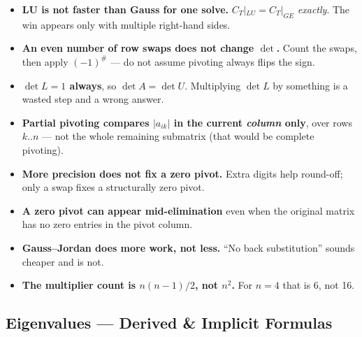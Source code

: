 \begin{trapbox}
\begin{itemize}
\item \textbf{LU is not faster than Gauss for one solve.} $C_T|_{LU} = C_T|_{GE}$ \emph{exactly}. The win appears only with multiple right-hand sides.
\item \textbf{An even number of row swaps does not change $\det$.} Count the swaps, then apply $(-1)^{\#}$ --- do not assume pivoting always flips the sign.
\item \textbf{$\det L = 1$ always}, so $\det A = \det U$. Multiplying $\det L$ by something is a wasted step and a wrong answer.
\item \textbf{Partial pivoting compares $|a_{ik}|$ in the current \emph{column} only}, over rows $k..n$ --- not the whole remaining submatrix (that would be complete pivoting).
\item \textbf{More precision does not fix a zero pivot.} Extra digits help round-off; only a swap fixes a structurally zero pivot.
\item \textbf{A zero pivot can appear mid-elimination} even when the original matrix has no zero entries in the pivot column.
\item \textbf{Gauss--Jordan does more work, not less.} ``No back substitution'' sounds cheaper and is not.
\item \textbf{The multiplier count is $n(n-1)/2$, not $n^2$.} For $n=4$ that is 6, not 16.
\end{itemize}
\end{trapbox}

\subsection{Eigenvalues --- Derived \& Implicit Formulas}

